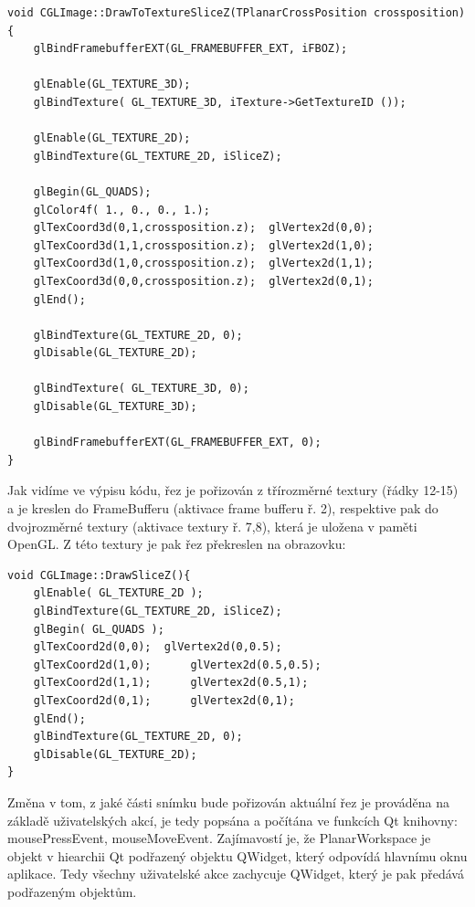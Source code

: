\begin{lstlisting}[label=DicomImageClass,caption={První část souboru \texttt{Window.cpp} se zdrojovým kódem třídy reprezentující okno programu.}]
void CGLImage::DrawToTextureSliceZ(TPlanarCrossPosition crossposition){
	glBindFramebufferEXT(GL_FRAMEBUFFER_EXT, iFBOZ);

 	glEnable(GL_TEXTURE_3D);
	glBindTexture( GL_TEXTURE_3D, iTexture->GetTextureID ());

	glEnable(GL_TEXTURE_2D);
	glBindTexture(GL_TEXTURE_2D, iSliceZ);

	glBegin(GL_QUADS);
	glColor4f( 1., 0., 0., 1.);
	glTexCoord3d(0,1,crossposition.z); 	glVertex2d(0,0);
	glTexCoord3d(1,1,crossposition.z); 	glVertex2d(1,0);
	glTexCoord3d(1,0,crossposition.z); 	glVertex2d(1,1);
	glTexCoord3d(0,0,crossposition.z);	glVertex2d(0,1);
	glEnd();

	glBindTexture(GL_TEXTURE_2D, 0);
	glDisable(GL_TEXTURE_2D);

	glBindTexture( GL_TEXTURE_3D, 0);
	glDisable(GL_TEXTURE_3D);

	glBindFramebufferEXT(GL_FRAMEBUFFER_EXT, 0);
}
\end{lstlisting}

Jak vidíme ve výpisu kódu, řez je pořizován z třírozměrné textury (řádky 12-15) a je kreslen do FrameBufferu (aktivace frame bufferu ř. 2), respektive pak do dvojrozměrné textury (aktivace textury ř. 7,8), která je uložena v paměti OpenGL. Z této textury je pak řez překreslen na obrazovku:

\begin{lstlisting}[label=DicomImageClass,caption={První část souboru \texttt{Window.cpp} se zdrojovým kódem třídy reprezentující okno programu.}]
void CGLImage::DrawSliceZ(){
	glEnable( GL_TEXTURE_2D );
	glBindTexture(GL_TEXTURE_2D, iSliceZ);
	glBegin( GL_QUADS );
	glTexCoord2d(0,0); 	glVertex2d(0,0.5);
	glTexCoord2d(1,0);		glVertex2d(0.5,0.5);
	glTexCoord2d(1,1);		glVertex2d(0.5,1);
	glTexCoord2d(0,1);		glVertex2d(0,1);
	glEnd();
	glBindTexture(GL_TEXTURE_2D, 0);
	glDisable(GL_TEXTURE_2D);
}
\end{lstlisting}

Změna v tom, z jaké části snímku bude pořizován aktuální řez je prováděna na základě uživatelských akcí, je tedy popsána a počítána ve funkcích Qt knihovny: mousePressEvent, mouseMoveEvent. Zajímavostí je, že PlanarWorkspace je objekt v hiearchii Qt podřazený objektu QWidget, který odpovídá hlavnímu oknu aplikace. Tedy všechny uživatelské akce zachycuje QWidget, který je pak předává podřazeným objektům.

